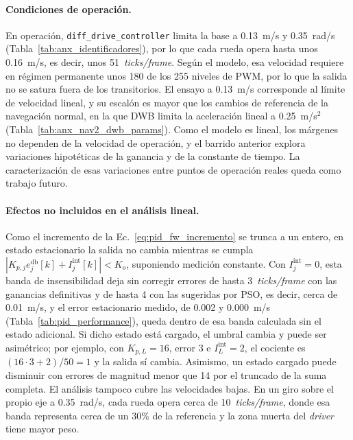 \begin{appendices}
\paragraph{Condiciones de operación.} En operación,
\texttt{diff\_drive\_controller} limita la base a 0.13~m/s y 0.35~rad/s
(Tabla~\ref{tab:anx_identificadores}), por lo que cada rueda opera hasta unos
0.16~m/s, es decir, unos 51~\textit{ticks/frame}. Según el modelo, esa
velocidad requiere en régimen permanente unos 180 de los 255 niveles de PWM,
por lo que la salida no se satura fuera de los transitorios. El ensayo a
0.13~m/s corresponde al límite de velocidad lineal, y su escalón es mayor que
los cambios de referencia de la navegación normal, en la que DWB limita la
aceleración lineal a 0.25~m/s$^2$ (Tabla~\ref{tab:anx_nav2_dwb_params}). Como
el modelo es lineal, los márgenes no dependen de la velocidad de operación, y
el barrido anterior explora variaciones hipotéticas de la ganancia y de la
constante de tiempo. La caracterización de esas variaciones entre puntos de
operación reales queda como trabajo futuro.

\paragraph{Efectos no incluidos en el análisis lineal.} Como el incremento de
la Ec.~\eqref{eq:pid_fw_incremento} se trunca a un entero, en estado
estacionario la salida no cambia mientras se cumpla
$|K_{p,j}e_j^{\mathrm{db}}[k]+I_j^{\mathrm{int}}[k]|<K_o$, suponiendo
medición constante. Con $I_j^{\mathrm{int}}=0$, esta banda de insensibilidad
deja sin corregir errores de hasta 3~\textit{ticks/frame} con las ganancias definitivas y
de hasta 4 con las sugeridas por PSO, es decir, cerca de 0.01~m/s, y el error
estacionario medido, de 0.002 y 0.000~m/s (Tabla~\ref{tab:pid_performance}),
queda dentro de esa banda calculada sin el estado adicional. Si dicho estado
está cargado, el umbral cambia y puede ser asimétrico; por ejemplo, con
$K_{p,L}=16$, error 3 e $I_L^{\mathrm{int}}=2$, el cociente es
$(16\cdot3+2)/50=1$ y la salida sí cambia. Asimismo, un estado cargado puede
disminuir con errores de magnitud menor que 14 por el truncado de la suma
completa. El análisis tampoco cubre las velocidades bajas. En un
giro sobre el propio eje a 0.35~rad/s, cada rueda opera cerca de
10~\textit{ticks/frame}, donde esa banda representa cerca de un 30\% de la
referencia y la zona muerta del \textit{driver} tiene mayor peso.


\end{appendices}

